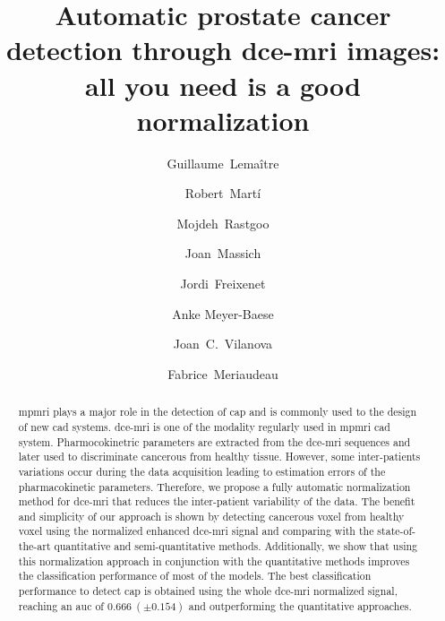 \documentclass[review]{elsarticle}
\begin{document}
\begin{frontmatter}

\title{Automatic prostate cancer detection through \acs*{dce}-\acs*{mri} images: all you need is a good normalization}

\author[label1,label3]{Guillaume~Lema\^itre}
\author[label3]{Robert~Mart\'i}
\author[label1]{Mojdeh~Rastgoo}
\author[label1]{Joan~Massich}
\author[label3]{Jordi~Freixenet}
\author[label5]{Anke Meyer-Baese}
\author[label4]{Joan~C.~Vilanova}
\author[label1,label6]{Fabrice~Meriaudeau}
\address[label1]{\scriptsize LE2I UMR6306, CNRS, Arts et M\'etiers, Univ. Bourgogne Franche-Comt\'e, 12 rue de la Fonderie, 71200 Le Creusot, France}
\address[label3]{\scriptsize ViCOROB, Universitat de Girona, Campus Montilivi, Edifici P4, 17071 Girona, Spain}
\address[label4]{\scriptsize Department of Magnetic Resonance, Cl\'inica Girona, Lorenzana 36, 17002 Girona, Spain}
\address[label5]{\scriptsize Department of Scientific Computing, 400 Dirac Science Library, Florida State University, Tallahassee, FL 32306, United States}
\address[label6]{\scriptsize CISIR, Electrical \& Electronic Engineering Department, Universiti Teknologi Petronas, 32610 Seri Iskandar, Perak, Malaysia}

\begin{abstract}
\Ac{mpmri} plays a major role in the detection of \ac{cap} and is commonly used to the design of new \ac{cad} systems.
\ac{dce}-\ac{mri} is one of the modality regularly used in \ac{mpmri} \ac{cad} system.
Pharmocokinetric parameters are extracted from the \ac{dce}-\ac{mri} sequences and later used to discriminate cancerous from healthy tissue.
However, some inter-patients variations occur during the data acquisition leading to estimation errors of the pharmacokinetic parameters.
Therefore, we propose a fully automatic normalization method for \ac{dce}-\ac{mri} that reduces the inter-patient variability of the data.
The benefit and simplicity of our approach is shown by detecting cancerous voxel from healthy voxel using the normalized enhanced \ac{dce}-\ac{mri} signal and comparing with the state-of-the-art quantitative and semi-quantitative methods.
Additionally, we show that using this normalization approach in conjunction with the quantitative methods improves the classification performance of most of the models.
The best classification performance to detect \ac{cap} is obtained using the whole \ac{dce}-\ac{mri} normalized signal, reaching an \ac{auc} of $0.666\ (\pm 0.154)$ and outperforming the quantitative approaches.
\end{abstract}


\end{frontmatter}
\end{document}
